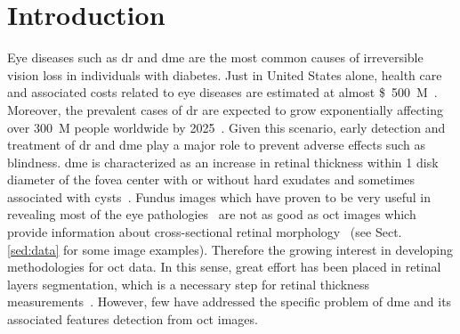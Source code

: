 \graphicspath{ {./content/intro/figures/} }

\section{Introduction}
\label{sec:intro}  %

    Eye diseases such as \gls{dr} and \gls{dme} are the most common causes of
    irreversible vision loss in individuals with diabetes.  Just in United States
    alone, health care and associated costs related to eye diseases are estimated
    at almost \SI{500}[\$]{M}~\cite{Sharma2005}.  Moreover, the prevalent cases of
    \gls{dr} are expected to grow exponentially affecting over \SI{300}{M} people
    worldwide by 2025~\cite{Wild2004}.  Given this scenario, early detection and
    treatment of \gls{dr} and \gls{dme} play a major role to prevent adverse
    effects such as blindness.  \gls{dme} is characterized as an increase in
    retinal thickness within 1 disk diameter of the fovea center with or without
    hard exudates and sometimes associated with cysts~\cite{ETDRSG1985}.  Fundus
    images which have proven to be very useful in revealing most of the eye
    pathologies~\cite{Mookiah20132136,Trucco2013} are not as good as \gls{oct}
    images which provide information about cross-sectional retinal
    morphology~\cite{Wang2015} (see Sect.\,\ref{sed:data} for some image examples).
    Therefore the growing interest in developing methodologies for \gls{oct} data.
    In this sense, great effort has been placed in retinal layers segmentation,
    which is a necessary step for retinal thickness measurements~\cite{Chiu2010,Kafieh2013}.
    However, few have addressed the specific problem of \gls{dme} and its associated features detection from \gls{oct} images.


